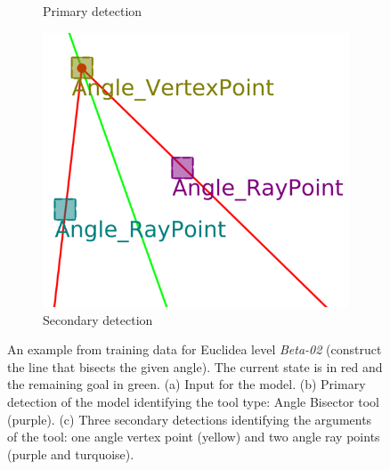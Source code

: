 \begin{figure}[ht]
\begin{subfigure}[b]{0.32\textwidth}
         \caption{Primary detection}
         \label{fig:training_data_primary_02_02_primary}
     \end{subfigure}
     \hfill
     \begin{subfigure}[b]{0.32\textwidth}
         \centering
         \includegraphics[width=\textwidth]{img/ExampleTrainingData/02_02_secondary.png}
         \caption{Secondary detection}
         \label{fig:training_data_primary_02_02_secondary}
     \end{subfigure}
        \caption{An example from training data for Euclidea level \textit{Beta-02} (construct the line that bisects the given angle).
        The current state is in red and the remaining goal in green.
        (a) Input for the \maskrcnn model.
        (b) Primary detection of the \maskrcnn model identifying the tool type: Angle Bisector tool (purple).
        (c) Three secondary detections identifying the arguments of the tool: one angle vertex point (yellow) and two angle ray points (purple and turquoise).}
        \label{fig:training_data_primary_02_02}
        \vspace*{-1.5em}
\end{figure}


